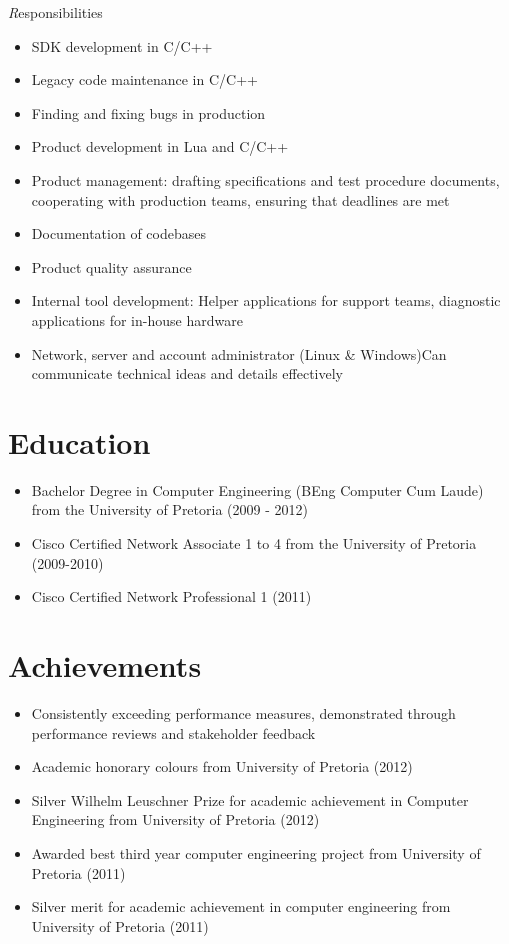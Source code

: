 \documentclass[11pt,a4paper]{article}
\begin{document}
	
	{\emph Responsibilities}
	\begin{itemize}
		\item SDK development in C/C++
		\item Legacy code maintenance in C/C++
		\item Finding and fixing bugs in production
		\item Product development in Lua and C/C++
		\item Product management: drafting specifications and test procedure documents, cooperating with production teams, ensuring that deadlines are met 
		\item Documentation of codebases
		\item Product quality assurance		
		\item Internal tool development: Helper applications for support teams, diagnostic applications for in-house hardware 
		\item Network, server and account administrator (Linux \& Windows)Can communicate technical ideas and details effectively
	\end{itemize}

\section*{Education}
\begin{itemize}
	\item Bachelor Degree in Computer Engineering (BEng Computer Cum Laude) from the University of Pretoria (2009 - 2012) 
	\item Cisco Certified Network Associate 1 to 4 from the University of Pretoria (2009-2010)
	\item Cisco Certified Network Professional 1 (2011)

\end{itemize}	
	
\section*{Achievements}
\begin{itemize}
	\item Consistently exceeding performance measures, demonstrated through performance reviews and stakeholder feedback 
	\item Academic honorary colours from University of Pretoria (2012)
	\item Silver Wilhelm Leuschner Prize for academic achievement in Computer Engineering from University of Pretoria (2012) 
	\item Awarded best third year computer engineering project from University of Pretoria (2011) 
	\item Silver merit for academic achievement in computer engineering from University of Pretoria (2011) 
\end{itemize} 
\end{document}
